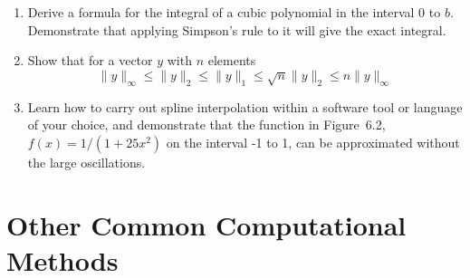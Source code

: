 \documentclass{article}
\begin{document}
\begin{enumerate}
\item Derive a formula for the integral of a cubic polynomial in the interval 0 to $b$. Demonstrate that applying Simpson's rule to it will give the exact integral.

\item Show that for a vector $y$ with $n$ elements
  \[
  \lVert y \rVert_\infty
  \leq \lVert y \rVert_2
  \leq \lVert y \rVert_1
  \leq \sqrt{n} \lVert y \rVert_2
  \leq n \lVert y \rVert_\infty
  \]


\item Learn how to carry out spline interpolation within a software tool or language of your choice, and demonstrate that the function in Figure~6.2, $f(x)=1/(1+25x^2)$ on the interval -1 to 1, can be approximated without the large oscillations.

  
\end{enumerate}
 









\section{Other Common Computational Methods}
\end{document}
